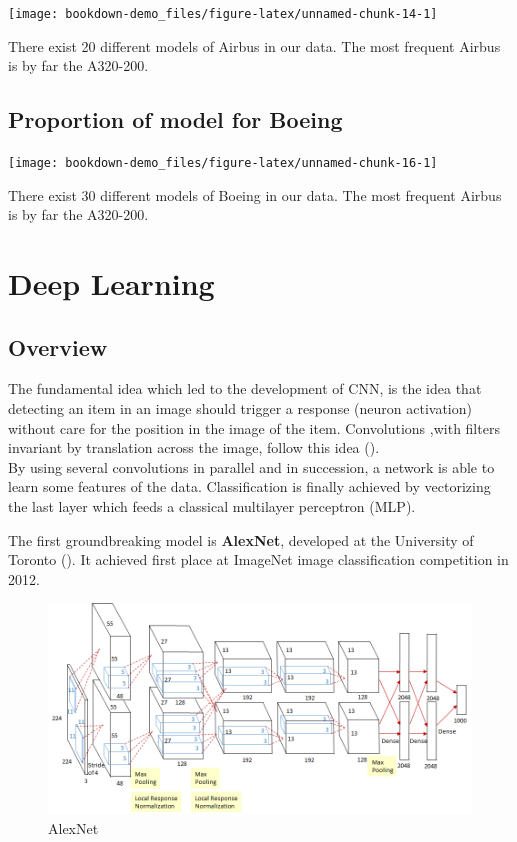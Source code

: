 \documentclass[]{book}
\begin{document}
\begin{center}\texttt{[image: bookdown-demo\_files/figure-latex/unnamed-chunk-14-1]} \end{center}

There exist 20 different models of Airbus in our data.
The most frequent Airbus is by far the A320-200.

\hypertarget{proportion-of-model-for-boeing}{%
\section{Proportion of model for Boeing}\label{proportion-of-model-for-boeing}}

\begin{center}\texttt{[image: bookdown-demo\_files/figure-latex/unnamed-chunk-16-1]} \end{center}

There exist 30 different models of Boeing in our data.
The most frequent Airbus is by far the A320-200.

\hypertarget{deep-learning}{%
\chapter{Deep Learning}\label{deep-learning}}

\hypertarget{overview}{%
\section{Overview}\label{overview}}

The fundamental idea which led to the development of CNN, is the idea that detecting an item in an image should trigger a response (neuron activation) without care for the position in the image of the item. Convolutions ,with filters invariant by translation across the image, follow this idea (\citet{Mallat_2016}).\\
By using several convolutions in parallel and in succession, a network is able to learn some features of the data.
Classification is finally achieved by vectorizing the last layer which feeds a classical multilayer perceptron (MLP).

The first groundbreaking model is \textbf{AlexNet}, developed at the University of Toronto (\citet{NIPS2012_4824}).
It achieved first place at ImageNet image classification competition in 2012.

\begin{figure}
\centering
\includegraphics{AlexNetArch.png}
\caption{AlexNet}
\end{figure}
\end{document}
